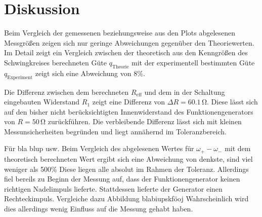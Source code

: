 \section{Diskussion}
\label{sec:Diskussion}
Beim Vergleich der gemessenen beziehungsweise aus den Plots abgelesenen Messgrößen zeigen sich nur geringe Abweichungen gegenüber den Theoriewerten.
Im Detail zeigt ein Vergleich zwischen der theoretisch aus den Kenngrößen des Schwingkreises berechneten Güte $q_\mathrm{Theorie}$ mit der experimentell bestimmten Güte $q_\mathrm{Experiment}$ zeigt sich eine Abweichung von $8\%$.

Die Differenz zwischen dem berechneten $R_\text{eff}$ und dem in der Schaltung eingebauten Widerstand $R_\text{1}$ zeigt eine Differenz von $\Delta R=60.1 \,\si{\ohm}$.
Diese lässt sich auf den bisher nicht berücksichtigten Innenwiderstand des Funktionengenerators von $R=50\,\si{\ohm}$ zurückführen. Die verbleibende Differenz lässt sich mit kleinen Messunsicherheiten begründen und liegt annähernd im Toleranzbereich.



Für bla blup usw.
Beim Vergleich des abgelesenen Wertes für $\omega_+ - \omega_-$ mit dem theoretisch berechneten Wert ergibt sich eine Abweichung von denkste, sind viel weniger als 500\%
Diese liegen alle absolut im Rahmen der Toleranz.
Allerdings fiel bereils zu Beginn der Messung auf, dass der Funktionengenerator keinen richtigen Nadelimpuls lieferte. Stattdessen lieferte der Generator einen Rechteckimpuls. Vergleiche dazu Abbildung blabiupskföoj
Wahrscheinlich wird dies allerdings wenig Einfluss auf die Messung gehabt haben.
